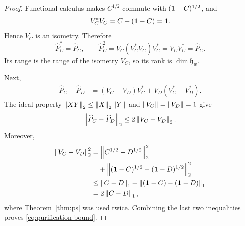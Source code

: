 \begin{proof}
Functional calculus makes $C^{1/2}$ commute with
$(\mathbf 1-C)^{1/2}$, and
\[
 V_C^*V_C=C+(\mathbf 1-C)=\mathbf 1.
\]
Hence $V_C$ is an isometry.  Therefore
\[
 \widehat P_C^*=\widehat P_C,\qquad
 \widehat P_C^2
 =V_C(V_C^*V_C)V_C^*
 =V_CV_C^*=\widehat P_C.
\]
Its range is the range of the isometry $V_C$, so its rank is
$\dim\mathfrak h_w$.

Next,
\[
\begin{aligned}
\widehat P_C-\widehat P_D
 &=(V_C-V_D)V_C^*+V_D(V_C^*-V_D^*).
\end{aligned}
\]
The ideal property
$\left\lVert XY\right\rVert_2\le\left\lVert X\right\rVert_2\left\lVert Y\right\rVert$ and
$\left\lVert V_C\right\rVert=\left\lVert V_D\right\rVert=1$ give
\[
 \left\lVert \widehat P_C-\widehat P_D\right\rVert_2
 \le 2\left\lVert V_C-V_D\right\rVert_2.
\]
Moreover,
\[
\begin{aligned}
\left\lVert V_C-V_D\right\rVert_2^2
 &=
 \left\lVert C^{1/2}-D^{1/2}\right\rVert_2^2\\
 &\quad+
 \left\lVert (\mathbf 1-C)^{1/2}-(\mathbf 1-D)^{1/2}\right\rVert_2^2\\
 &\le \left\lVert C-D\right\rVert_1+\left\lVert (\mathbf 1-C)-(\mathbf 1-D)\right\rVert_1\\
 &=2\left\lVert C-D\right\rVert_1,
\end{aligned}
\]
where Theorem~\ref{thm:ps} was used twice.  Combining the last two
inequalities proves \eqref{eq:purification-bound}.
\end{proof}

